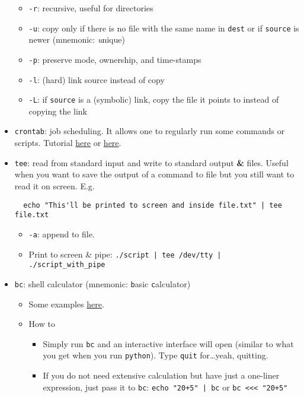 \documentclass[a4paper,12pt,%
              final%
              ]{article}
\begin{document}
\begin{itemize}
\begin{itemize}
      \item \verb|-r|: recursive, useful for directories
      \item \verb|-u|: copy only if there is no file with the same name in \texttt{dest} or if \texttt{source} is newer (mnemonic: \emph{u}nique)
      \item \verb|-p|: preserve mode, ownership, and time-stamps
      \item \verb|-l|: (hard) link source instead of copy
      \item \verb|-L|: if \texttt{source} is a (symbolic) link, copy the file it points to instead of copying the link
    \end{itemize}
  \item \verb|crontab|: job scheduling. It allows one to regularly run some commands or scripts. Tutorial \href{https://www.adminschoice.com/crontab-quick-reference}{here} or \href{https://www.computerhope.com/unix/ucrontab.htm}{here}.
  \item \texttt{tee}: read from standard input and write to standard output \textbf{\&} files. Useful when you want to save the output of a command to file but you still want to read it on screen. E.g.
\begin{verbatim}
  echo "This'll be printed to screen and inside file.txt" | tee file.txt
\end{verbatim}
    \begin{itemize}
      \item \verb|-a|: append to file.
      \item Print to screen \& pipe: \verb!./script | tee /dev/tty | ./script_with_pipe!
    \end{itemize}
  \item \texttt{bc}: shell calculator (mnemonic: \texttt{b}asic \texttt{c}alculator)
    \begin{itemize}
      \item Some examples \href{https://www.geeksforgeeks.org/bc-command-linux-examples/}{here}.
      \item How to
        \begin{itemize}
          \item Simply run \texttt{bc} and an interactive interface will open (similar to what you get when you run \texttt{python}). Type \texttt{quit} for\ldots yeah, quitting.
          \item If you do not need extensive calculation but have just a one-liner expression, just pass it to \texttt{bc}: \verb!echo "20+5" | bc! or \verb|bc <<< "20+5"|

\end{itemize}
\end{itemize}
\end{itemize}
\end{document}
